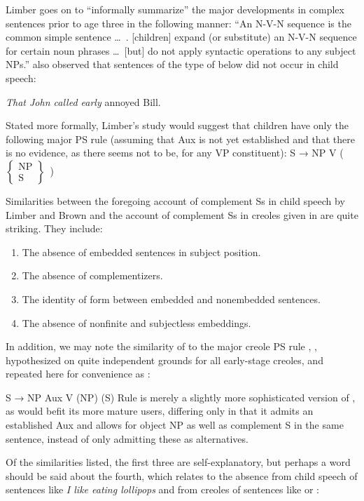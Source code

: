 Limber goes on to ``informally summarize'' the major developments in complex sentences prior to age three in the following manner: ``An N-V-N sequence is the common simple sentence \ldots~. [children] expand (or substitute) an N-V-N sequence for certain noun phrases \ldots~[but] do not apply syntactic operations to any subject NPs.'' \citet[21]{Brown1973} also observed that sentences of the type of  below did not occur in child speech:

\ea\label{ex:3:38}
 \textit{That John called early} annoyed Bill.
\z

\noindent Stated more formally, Limber's study would suggest that children have only the following major PS rule (assuming that Aux is not yet 
established and that there is no evidence, as there seems not to be, for any VP constituent):
\ea\label{ex:3:39}
S → NP V (~$\left\{\begin{array}{c}\text{NP}\\\text{S}\end{array}\right\}$~)
\z

Similarities between the foregoing account of complement Ss in child speech by Limber and Brown and the account of complement Ss in creoles given in  are quite striking. They include:

\begin{enumerate}
\item The absence of embedded sentences in subject position.
\item The absence of complementizers.
\item The identity of form between embedded and nonembedded sentences.
\item The absence of nonfinite and subjectless embeddings.
\end{enumerate}
 
In addition, we may note the similarity of  to the major creole PS rule , , hypothesized on quite independent grounds for all early-stage creoles, and repeated here for convenience as :

\ea\label{ex:3:40}
 S → NP Aux V (NP) (S) 
\z
Rule  is merely a slightly more sophisticated version of , as would befit its more mature users, differing only in that it admits an established Aux and allows for object NP as well as complement S in the same sentence, instead of only admitting these as alternatives.

Of the similarities listed, the first three are self-explanatory, but perhaps a word should be said about the fourth, which relates to the absence from child speech of sentences like \textit{I like eating lollipops} and from creoles of sentences like  or :


